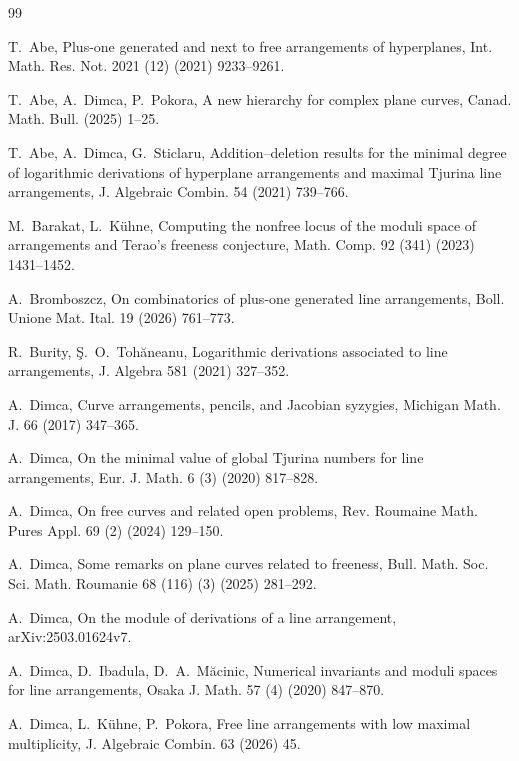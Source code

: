 \documentclass[11pt]{amsart}   %
\theoremstyle{definition}
\begin{document}
\begin{thebibliography}{99}


T.~Abe,
Plus-one generated and next to free arrangements of hyperplanes,
Int. Math. Res. Not.  2021 (12) (2021) 9233--9261.

T.~Abe, A.~Dimca, P.~Pokora,
A new hierarchy for complex plane curves,
Canad. Math. Bull. (2025) 1--25.


T.~Abe, A.~Dimca, G.~Sticlaru,
Addition--deletion results for the minimal degree of logarithmic
derivations of hyperplane arrangements and maximal Tjurina line
arrangements,
J. Algebraic Combin. 54 (2021) 739--766.

M.~Barakat, L.~K\"uhne,
Computing the nonfree locus of the moduli space of arrangements and
Terao's freeness conjecture,
Math. Comp. 92 (341) (2023) 1431--1452.

A.~Bromboszcz,
On combinatorics of plus-one generated line arrangements,
Boll. Unione Mat. Ital. 19 (2026) 761--773.

R.~Burity, {\c S}.~O.~Toh\u{a}neanu,
Logarithmic derivations associated to line arrangements,
J. Algebra 581 (2021) 327--352.


A.~Dimca,
Curve arrangements, pencils, and Jacobian syzygies,
Michigan Math. J. 66 (2017) 347--365.

A.~Dimca,
On the minimal value of global Tjurina numbers for line arrangements,
Eur. J. Math. 6 (3) (2020) 817--828.

A.~Dimca,
On free curves and related open problems,
Rev. Roumaine Math. Pures Appl. 69 (2) (2024) 129--150.

A.~Dimca,
Some remarks on plane curves related to freeness,
Bull. Math. Soc. Sci. Math. Roumanie 68 (116) (3) (2025) 281--292.

A.~Dimca,
On the module of derivations of a line arrangement,
 arXiv:2503.01624v7.

A.~Dimca, D.~Ibadula, D.~A.~M\u{a}cinic,
Numerical invariants and moduli spaces for line arrangements,
Osaka J. Math. 57 (4) (2020) 847--870.

A.~Dimca, L.~K\"uhne, P.~Pokora,
Free line arrangements with low maximal multiplicity,
J. Algebraic Combin. 63 (2026) 45.


\end{thebibliography}
\end{document}
